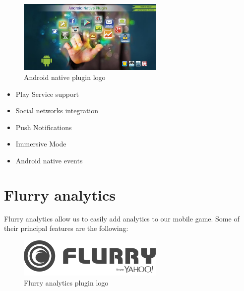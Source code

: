 \begin{figure}[h]
\centering
\includegraphics[width=200pt]{graphics/enabling-tech/androidnative_logo.jpeg}
\caption{Android native plugin logo}
\label{fig:androidnative_logo}
\end{figure}

\begin{itemize}
\item Play Service support
\item Social networks integration
\item Push Notifications
\item Immersive Mode
\item Android native events
\end{itemize}


\section{Flurry analytics}
\label{sec:flurry}
Flurry analytics allow us to easily add analytics to our mobile game. Some of their principal features are the following:~\cite{flurry1}

\begin{figure}[h]
\centering
\includegraphics[width=200pt]{graphics/enabling-tech/flurry_logo.png}
\caption{Flurry analytics plugin logo}
\label{fig:flurry_logo}
\end{figure}


